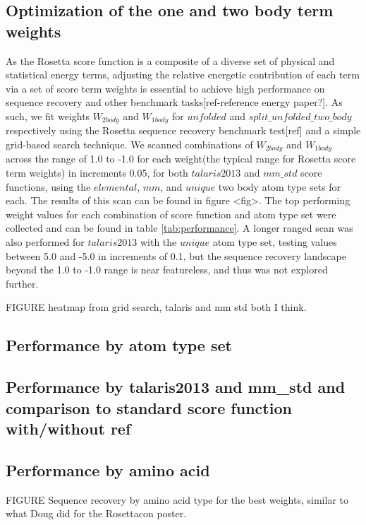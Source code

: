 \subsection{Optimization of the one and two body term weights}
As the Rosetta score function is a composite of a diverse set of physical and statistical energy terms, adjusting the relative energetic contribution of each term via a set of score term weights is essential to achieve high performance on sequence recovery and other benchmark tasks[ref-reference energy paper?].
As such, we fit weights $W_{2body}$ and $W_{1body}$ for $unfolded$ and $split\_unfolded\_two\_body$ respectively using the Rosetta sequence recovery benchmark test[ref] and a simple grid-based search technique.
We scanned combinations of $W_{2body}$ and $W_{1body}$ across the range of 1.0 to -1.0 for each weight(the typical range for Rosetta score term weights) in increments 0.05, for both $talaris2013$ and $mm\_std$ score functions, using the $elemental$, $mm$, and $unique$ two body atom type sets for each.
The results of this scan can be found in figure <fig>.
The top performing weight values for each combination of score function and atom type set were collected and can be found in table \ref{tab:performance}.
A longer ranged scan was also performed for $talaris2013$ with the $unique$ atom type set, testing values between 5.0 and -5.0 in increments of 0.1, but the sequence recovery landscape beyond the 1.0 to -1.0 range is near featureless, and thus was not explored further.

FIGURE heatmap from grid search, talaris and mm std both I think.

\subsection{Performance by atom type set}

\subsection{Performance by talaris2013 and mm\_std and comparison to standard score function with/without ref}

\subsection{Performance by amino acid}

FIGURE Sequence recovery by amino acid type for the best weights, similar to what Doug did for the Rosettacon poster.

